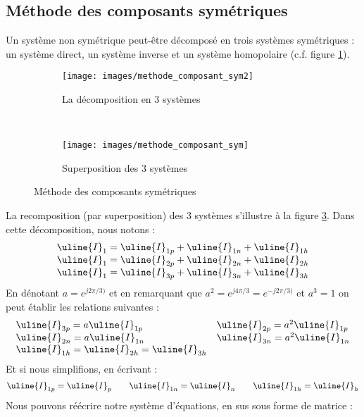 \documentclass[12pt,a4paper]{article}
\newcommand{\ui}{\uline{I} }
\begin{document}
\subsection{Méthode des composants symétriques}
Un système non symétrique peut-être décomposé en trois systèmes symétriques : un système direct, un système inverse et un système homopolaire (c.f. figure \ref{subfig: methode composants symetriques}). 
\begin{figure}
	\begin{subfigure}[b]{0.9\textwidth}
		\centering	
		\texttt{[image: images/methode\_composant\_sym2]}
		\caption{La décomposition en 3 systèmes}
		\label{subfig: methode composants symetriques}
	\end{subfigure}\\
	\begin{subfigure}[b]{0.9\textwidth}
		\centering
		\texttt{[image: images/methode\_composant\_sym]}
		\caption{Superposition des 3 systèmes}
		\label{subfig: methode composants symetriques2}
	\end{subfigure}
	\caption{Méthode des composants symétriques}
\end{figure}
La recomposition (par superposition) des 3 systèmes s'illustre à la figure \ref{subfig: methode composants symetriques2}. Dans cette décomposition, nous notons :
\[\begin{array}{l}
	\ui_1 = \ui_{1p} + \ui_{1n} + \ui_{1h}\\
	\ui_1 = \ui_{2p} + \ui_{2n} + \ui_{2h}\\
	\ui_1 = \ui_{3p} + \ui_{3n} + \ui_{3h}
\end{array}\]
En dénotant $a = e^{j2\pi/3)}$ et en remarquant que $a^2 = e^{j4\pi/3} = e^{-j2\pi/3)}$ et $a^3 = 1$ on peut établir les relations suivantes :
\[\begin{array}{ll}
	\ui_{3p} = a\ui_{1p} & \ui_{2p} = a^2 \ui_{1p}\\
	\ui_{2n} = a\ui_{1n} & \ui_{3n} = a^2 \ui_{1n}\\
	\ui_{1h} = \ui_{2h} = \ui_{3h}
\end{array}\]
Et si nous simplifions, en écrivant :
\[\ui_{1p} = \ui_p \qquad \ui_{1n} = \ui_n \qquad \ui_{1h} = \ui_h\]
Nous pouvons réécrire notre système d'équations, en sus sous forme de matrice :
\end{document}

